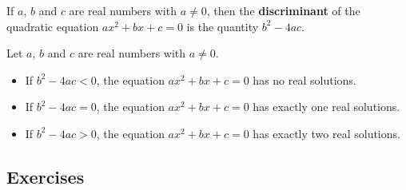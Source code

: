 \begin{definition}[Discriminant]
    If $a$, $b$ and $c$ are real numbers with $a \neq 0$, then the \textbf{discriminant} of the quadratic equation $ax^2 + bx + c = 0$ is the quantity $b^2 - 4ac$.
\end{definition}

\begin{definition}
    Let $a$, $b$ and $c$ are real numbers with $a \neq 0$.
    \begin{itemize}
        \item If $b^2 - 4ac < 0$, the equation  $ax^2 + bx + c = 0$ has no real solutions.
        \item If $b^2 - 4ac = 0$, the equation  $ax^2 + bx + c = 0$ has exactly one real solutions.
        \item If $b^2 - 4ac > 0$, the equation  $ax^2 + bx + c = 0$ has exactly two real solutions.
    \end{itemize}
\end{definition}

\subsection{Exercises}

